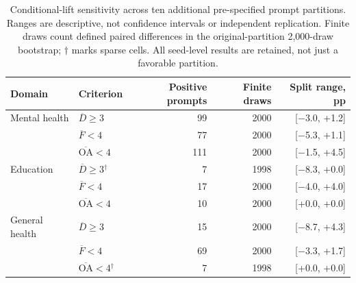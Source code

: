 \begin{table}[htbp]
\centering\small
\caption{Conditional-lift sensitivity across ten additional pre-specified prompt partitions. Ranges are descriptive, not confidence intervals or independent replication. Finite draws count defined paired differences in the original-partition 2,000-draw bootstrap; $\dagger$ marks sparse cells. All seed-level results are retained, not just a favorable partition.}
\label{tab:split_sensitivity}
\begin{tabular}{llrrr}
\toprule
Domain & Criterion & Positive prompts & Finite draws & Split range, pp \\
\midrule
Mental health & $\overline D\geq3$ & 99 & 2000 & [\ensuremath{-}3.0, +1.2] \\
 & $\overline F<4$ & 77 & 2000 & [\ensuremath{-}5.3, +1.1] \\
 & $\overline{\mathrm{OA}}<4$ & 111 & 2000 & [\ensuremath{-}1.5, +4.5] \\
Education & $\overline D\geq3$$^{\dagger}$ & 7 & 1998 & [\ensuremath{-}8.3, +0.0] \\
 & $\overline F<4$ & 17 & 2000 & [\ensuremath{-}4.0, +4.0] \\
 & $\overline{\mathrm{OA}}<4$ & 10 & 2000 & [+0.0, +0.0] \\
General health & $\overline D\geq3$ & 15 & 2000 & [\ensuremath{-}8.7, +4.3] \\
 & $\overline F<4$ & 69 & 2000 & [\ensuremath{-}3.3, +1.7] \\
 & $\overline{\mathrm{OA}}<4$$^{\dagger}$ & 7 & 1998 & [+0.0, +0.0] \\
\bottomrule
\end{tabular}
\end{table}
